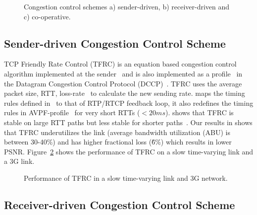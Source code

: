 \begin{figure}
  \centerline{
  }
  \centerline{
  }
  \centerline{
  }
  \caption{Congestion control schemes a) sender-driven, b) receiver-driven
and c) co-operative.}
  \label{fig:cc:scheme}
\end{figure}


\subsection{Sender-driven Congestion Control Scheme}

TCP Friendly Rate Control (TFRC) is an equation based congestion control
algorithm implemented at the sender~\cite{tfrc_347397} and is also implemented
as a profile~\cite{rfc4342} in the Datagram Congestion Control Protocol
(DCCP)~\cite{rfc4340}. TFRC uses the average packet size, RTT,
loss-rate~\cite{rfc3448} to calculate the new sending rate.
\cite{draft.rtp.tfrc} maps the timing rules defined in~\cite{rfc4828, rfc5348}
to that of RTP/RTCP feedback loop, it also redefines the timing rules in
AVPF-profile~\cite{rfc4585} for very short RTTs ($<20ms$).
\cite{Gharai06:ICME} shows that TFRC is stable on large RTT paths but less
stable for shorter paths~\cite{saurin:2006:thesis}. Our results in
 shows that TFRC underutilizes the link (average bandwidth
utilization (ABU) is between 30-40\%) and has higher fractional loss (\~6\%)
which results in lower PSNR. Figure~\ref{fig:tfrc} shows the performance of
TFRC on a slow time-varying link and a 3G link.

\begin{figure}
  \centerline{
  }
  \caption{Performance of TFRC in a slow time-varying link and 3G network.}
  \label{fig:tfrc}
\end{figure}


\subsection{Receiver-driven Congestion Control Scheme}

